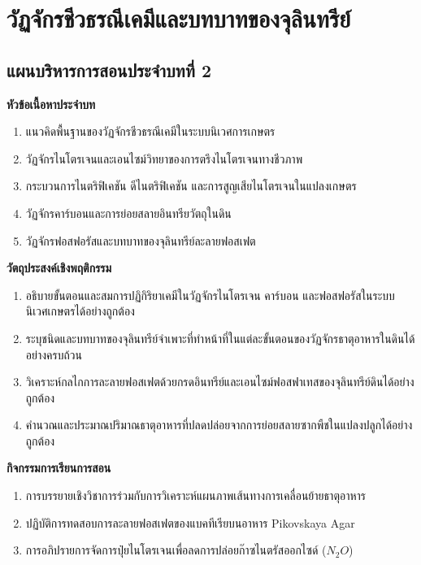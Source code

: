 \chapter{วัฏจักรชีวธรณีเคมีและบทบาทของจุลินทรีย์}
\label{chap:ch02}

\section*{แผนบริหารการสอนประจำบทที่ 2}

\noindent\textbf{หัวข้อเนื้อหาประจำบท}
\begin{enumerate}
    \item แนวคิดพื้นฐานของวัฏจักรชีวธรณีเคมีในระบบนิเวศการเกษตร
    \item วัฏจักรไนโตรเจนและเอนไซม์วิทยาของการตรึงไนโตรเจนทางชีวภาพ
    \item กระบวนการไนตริฟิเคชัน ดีไนตริฟิเคชัน และการสูญเสียไนโตรเจนในแปลงเกษตร
    \item วัฏจักรคาร์บอนและการย่อยสลายอินทรียวัตถุในดิน
    \item วัฏจักรฟอสฟอรัสและบทบาทของจุลินทรีย์ละลายฟอสเฟต
\end{enumerate}

\noindent\textbf{วัตถุประสงค์เชิงพฤติกรรม}
\begin{enumerate}
    \item อธิบายขั้นตอนและสมการปฏิกิริยาเคมีในวัฏจักรไนโตรเจน คาร์บอน และฟอสฟอรัสในระบบนิเวศเกษตรได้อย่างถูกต้อง
    \item ระบุชนิดและบทบาทของจุลินทรีย์จำเพาะที่ทำหน้าที่ในแต่ละขั้นตอนของวัฏจักรธาตุอาหารในดินได้อย่างครบถ้วน
    \item วิเคราะห์กลไกการละลายฟอสเฟตด้วยกรดอินทรีย์และเอนไซม์ฟอสฟาเทสของจุลินทรีย์ดินได้อย่างถูกต้อง
    \item คำนวณและประมาณปริมาณธาตุอาหารที่ปลดปล่อยจากการย่อยสลายซากพืชในแปลงปลูกได้อย่างถูกต้อง
\end{enumerate}

\noindent\textbf{กิจกรรมการเรียนการสอน}
\begin{enumerate}
    \item การบรรยายเชิงวิชาการร่วมกับการวิเคราะห์แผนภาพเส้นทางการเคลื่อนย้ายธาตุอาหาร
    \item ปฏิบัติการทดสอบการละลายฟอสเฟตของแบคทีเรียบนอาหาร Pikovskaya Agar
    \item การอภิปรายการจัดการปุ๋ยไนโตรเจนเพื่อลดการปล่อยก๊าซไนตรัสออกไซด์ ($N_2O$)
\end{enumerate}

